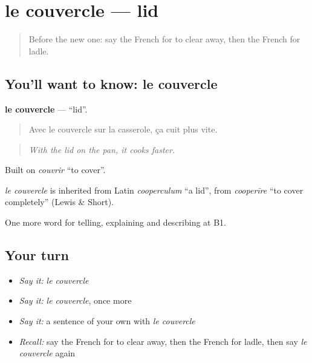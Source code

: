 \section[le couvercle]{le couvercle — lid}

\label{lesson:FR-C529-couvercle}



\begin{quote}
Before the new one: say the French for to clear away, then the French for ladle.
\end{quote}

\subsection*{You'll want to know: le couvercle}
\textbf{le couvercle} — \textquotedblleft{}lid\textquotedblright{}.

\begin{quote}
Avec le couvercle sur la casserole, ça cuit plus vite.
\end{quote}

\begin{quote}
\emph{With the lid on the pan, it cooks faster.}
\end{quote}

Built on \emph{couvrir} \textquotedblleft{}to cover\textquotedblright{}.

\begin{cousinweb}
\emph{le couvercle} is inherited from Latin \emph{cooperculum} \textquotedblleft{}a lid\textquotedblright{}, from \emph{cooperīre} \textquotedblleft{}to cover completely\textquotedblright{} (Lewis \& Short).
\end{cousinweb}

\begin{grammarlens}[title={What you've built}]
One more word for telling, explaining and describing at B1.
\end{grammarlens}

\subsection*{Your turn}
\begin{itemize}
\raggedright
  \item \emph{Say it:} \emph{le couvercle}
  \item \emph{Say it:} \emph{le couvercle}, once more
  \item \emph{Say it:} a sentence of your own with \emph{le couvercle}
  \item \emph{Recall:} say the French for to clear away, then the French for ladle, then say \emph{le couvercle} again
\end{itemize}

